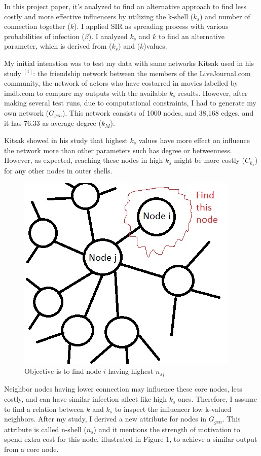 \documentclass[11pt,a4,twocolumn]{article}
\begin{document}
In this project paper, it's analyzed to find an alternative approach to find less costly and more effective influencers by utilizing the k-shell ($k_{s}$) and number of connection together ($k$). I applied SIR as spreading process  with various probabilities of infection ($\beta$). I analyzed $k_{s}$ and $k$ to find  an alternative parameter, which is derived from ($k_{s}$) and ($k$)values. 

My initial intenstion was to test my data with same networks Kitsak used in his study  $^{[1]}$:  the friendship network between the members of the LiveJournal.com community,  the network of actors who have costarred in movies labelled by imdb.com to compare my outputs with the available $k_{s}$ results. However, after making several test runs, due to computational constraints, I had to generate my own network ($G_{gen}$). This network consists of 1000 nodes, and 38,168 edges, and it has 76.33 as average degree ($k_{M}$).

Kitsak showed in his study that highest $k_{s}$ values have more effect on influence the network more than other parameters such has degree or betweenness. However, as expected, reaching these nodes in high $k_{s}$ might be more costly ($C_{k_{s}}$) for any other nodes in outer shells. 

\begin{figure}[h]
\centerline{\includegraphics[scale=.5]{nodes.jpg}}
\caption{Objective is to find node $i$ having highest ${n_{s}}_i$}
\label{fig}
\end{figure}

Neighbor nodes having lower connection may influence these core nodes, less costly, and can have similar infection affect like high $k_{s}$ ones. Therefore, I assume to find a relation between $k$ and $k_{s}$ to inspect the influencer low k-valued neighbors. After my study, I derived a new attribute for nodes in $G_{gen}$. This attribute is called n-shell ($n_{s}$) and it mentions the strength of motivation to spend extra cost for this node, illustrated in Figure 1, to achieve a similar output from a core node. 
\end{document}
